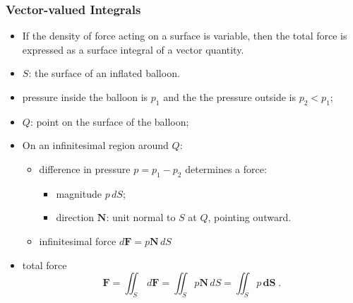 \begin{frame}
  \frametitle{Vector-valued Integrals}

\begin{itemize}
  \item \pause If the density of force acting on a surface is variable, then the total force is expressed as a surface integral of a vector quantity.
\end{itemize}

\begin{itemize}
  \item \pause $S$: the surface of an inflated balloon.
  \item \pause pressure inside the balloon is $p_1$ and the the pressure outside is $p_2 < p_1$;
  \item \pause $Q$: point on the surface of the balloon;
  \item On an infinitesimal region around $Q$:
  \begin{itemize}
    \item \pause difference in pressure $p = p_1-p_2$ determines a force:
        \begin{itemize}
          \item \pause magnitude $p\, dS$;
          \item \pause direction $\textbf{N}$: unit normal to $S$ at $Q$, pointing outward.
        \end{itemize}
    \item \pause infinitesimal force $d\textbf{F} = p \textbf{N} \, dS$
  \end{itemize}
  \item \pause total force
%
$$\bm{F} =  \iint_S \, d\textbf{F} = \iint_S p \textbf{N} \, dS = \iint_S p\, \bm{dS} \; .$$
\end{itemize}
\end{frame}